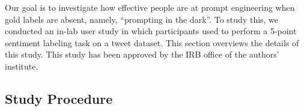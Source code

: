 Our goal is to investigate how effective people are at prompt engineering when gold labels are absent, namely, ``prompting in the dark''. 
To study this, we conducted an in-lab user study in which participants used \system to perform a 5-point sentiment labeling task on a tweet dataset. 
This section overviews the details of this study.
This study has been approved by the IRB office of the authors' institute. 


\subsection{Study Procedure}







\begin{comment}


\kenneth{--------------------------KENNETH IS WORKING HERE-----------------------------------}


We aimed to track accuracy trends in data annotation tasks throughout human prompt refinement processes. 
This section detailed the procedure. 
Previous study indicates that LLM explanations enhance understanding of the context~\cite{ma2023insightpilot,singh2024rethinking}. 
To explore this, we implemented two distinct conditions in our study: one group was given access to \textbf{LLM Explanation}, while the other group was not.
Due to time constraints, participants were only able to work with a limited number of data instances per iteration. We established two additional conditions: in one, participants worked on approximately 10 instances per iteration, allowing them to review each instance and its labels in detail. In the other, participants were presented with \textbf{50 instances} and instructed to quickly skim through them to gather insights.\steven{TODO: find papers. } \steven{two variables: LLM Explanation and 50 instances}


    
\end{comment}